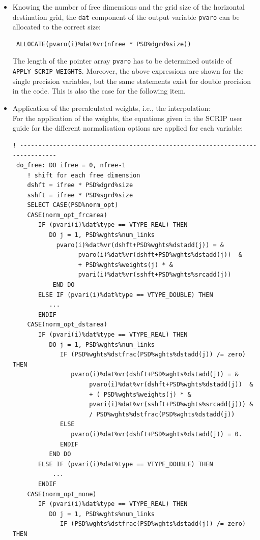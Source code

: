 \documentclass[11pt,twoside]{article}
\begin{document}
\begin{itemize}
\item Knowing the number of free dimensions and the grid size of the
horizontal destination grid, the \verb|dat| component of the output
variable \verb|pvaro| can be allocated to the correct size:
\begin{verbatim}
 ALLOCATE(pvaro(i)%dat%vr(nfree * PSD%dgrd%size))
\end{verbatim}
The length of the pointer array \verb|pvaro| has to be
determined outside of \verb|APPLY_SCRIP_WEIGHTS|.
Moreover, the above expressions are shown for the single precision
variables, but the same statements exist for double precision in the
code.
This is also the case for the following item.
\item Application of the precalculated weights, i.e., the interpolation:\\
For the application of the weights, the equations given in the SCRIP
user guide for the different normalisation options are applied for
each variable:
\begin{verbatim}
! -----------------------------------------------------------------------------
 do_free: DO ifree = 0, nfree-1
    ! shift for each free dimension
    dshft = ifree * PSD%dgrd%size
    sshft = ifree * PSD%sgrd%size
    SELECT CASE(PSD%norm_opt)
    CASE(norm_opt_frcarea)
       IF (pvari(i)%dat%type == VTYPE_REAL) THEN
          DO j = 1, PSD%wghts%num_links
            pvaro(i)%dat%vr(dshft+PSD%wghts%dstadd(j)) = &
                  pvaro(i)%dat%vr(dshft+PSD%wghts%dstadd(j))  &  
                  + PSD%wghts%weights(j) * &
                  pvari(i)%dat%vr(sshft+PSD%wghts%srcadd(j))
           END DO
       ELSE IF (pvari(i)%dat%type == VTYPE_DOUBLE) THEN
          ...
       ENDIF
    CASE(norm_opt_dstarea)
       IF (pvari(i)%dat%type == VTYPE_REAL) THEN
          DO j = 1, PSD%wghts%num_links
             IF (PSD%wghts%dstfrac(PSD%wghts%dstadd(j)) /= zero) THEN
                pvaro(i)%dat%vr(dshft+PSD%wghts%dstadd(j)) = &
                     pvaro(i)%dat%vr(dshft+PSD%wghts%dstadd(j))  &  
                     + ( PSD%wghts%weights(j) * &
                     pvari(i)%dat%vr(sshft+PSD%wghts%srcadd(j))) &
                     / PSD%wghts%dstfrac(PSD%wghts%dstadd(j))
             ELSE
                pvaro(i)%dat%vr(dshft+PSD%wghts%dstadd(j)) = 0.
             ENDIF
          END DO
       ELSE IF (pvari(i)%dat%type == VTYPE_DOUBLE) THEN
           ...
       ENDIF
    CASE(norm_opt_none)
       IF (pvari(i)%dat%type == VTYPE_REAL) THEN
          DO j = 1, PSD%wghts%num_links
             IF (PSD%wghts%dstfrac(PSD%wghts%dstadd(j)) /= zero) THEN
                

\end{verbatim}
\end{itemize}
\end{document}
